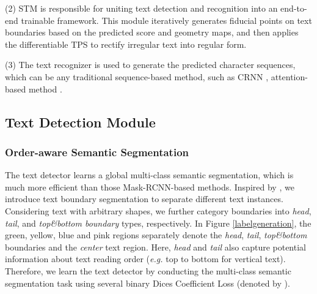 \documentclass[letterpaper]{article} \usepackage{aaai20}  \usepackage{times}  \usepackage{helvet} \usepackage{courier}  \usepackage[hyphens]{url}  \usepackage{graphicx} \urlstyle{rm} \def\UrlFont{\rm}  \usepackage{graphicx}  \frenchspacing  \setlength{\pdfpagewidth}{8.5in}  \setlength{\pdfpageheight}{11in}  \usepackage{amsmath}
\begin{document}
(2) STM is responsible for uniting text detection and recognition into an end-to-end trainable framework.
This module iteratively generates fiducial points on text boundaries based on the predicted score and geometry maps, and then applies the differentiable TPS to rectify irregular text into regular form.

(3) The text recognizer is used to generate the predicted character sequences, which can be any traditional sequence-based method, such as CRNN \cite{shi2017end}, attention-based method \cite{cheng2017focus}.

\subsection{Text Detection Module}
\subsubsection{Order-aware Semantic Segmentation}
The text detector learns a global multi-class semantic segmentation, which is much more efficient than those Mask-RCNN-based methods.
Inspired by \cite{xue2018accurate}, we introduce text boundary segmentation to separate different text instances.
Considering text with arbitrary shapes, we further category boundaries into \emph{head}, \emph{tail}, and \emph{top\&bottom boundary} types, respectively.
In Figure \ref{labelgeneration}, the green, yellow, blue and pink regions separately denote the \emph{head}, \emph{tail}, \emph{top\&bottom} boundaries and the \emph{center} text region.
Here, \emph{head} and \emph{tail} also capture potential information about text reading order (\emph{e.g.} top to bottom for vertical text).
Therefore, we learn the text detector by conducting the multi-class semantic segmentation task using several binary Dices Coefficient Loss \cite{milletari2016v} (denoted by ).
\end{document}

